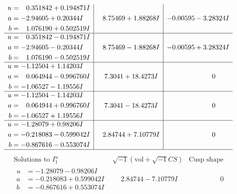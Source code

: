 \documentclass[1p]{elsarticle_modified}
\theoremstyle{definition}
\newcommand{\I}{\sqrt{-1}}
\begin{document}
$$\begin{array}{c|c|c}
\begin{aligned}
u &= \phantom{-}0.351842 + 0.194871 I \\
a &= -2.94605 + 0.20344 I \\
b &= \phantom{-}1.076190 + 0.502519 I\end{aligned}
 & \phantom{-}8.75469 + 1.88268 I & -0.00595 - 3.28324 I \\ \hline\begin{aligned}
u &= \phantom{-}0.351842 - 0.194871 I \\
a &= -2.94605 - 0.20344 I \\
b &= \phantom{-}1.076190 - 0.502519 I\end{aligned}
 & \phantom{-}8.75469 - 1.88268 I & -0.00595 + 3.28324 I \\ \hline\begin{aligned}
u &= -1.12504 + 1.14203 I \\
a &= \phantom{-}0.064944 - 0.996760 I \\
b &= -1.06527 - 1.19556 I\end{aligned}
 & \phantom{-}7.3041 + 18.4273 I & \phantom{-0.000000 } 0 \\ \hline\begin{aligned}
u &= -1.12504 - 1.14203 I \\
a &= \phantom{-}0.064944 + 0.996760 I \\
b &= -1.06527 + 1.19556 I\end{aligned}
 & \phantom{-}7.3041 - 18.4273 I & \phantom{-0.000000 } 0 \\ \hline\begin{aligned}
u &= -1.28079 + 0.98206 I \\
a &= -0.218083 - 0.599042 I \\
b &= -0.867616 - 0.553074 I\end{aligned}
 & \phantom{-}2.84744 + 7.10779 I & \phantom{-0.000000 } 0\\
 \hline 
 \end{array}$$\newpage$$\begin{array}{c|c|c}  
\text{Solutions to }I^u_{1}& \I (\text{vol} + \sqrt{-1}CS) & \text{Cusp shape}\\
 \hline 
\begin{aligned}
u &= -1.28079 - 0.98206 I \\
a &= -0.218083 + 0.599042 I \\
b &= -0.867616 + 0.553074 I\end{aligned}
 & \phantom{-}2.84744 - 7.10779 I & \phantom{-0.000000 } 0 \\ \hline\begin{aligned}

\end{aligned}
\end{array}$$
\end{document}
